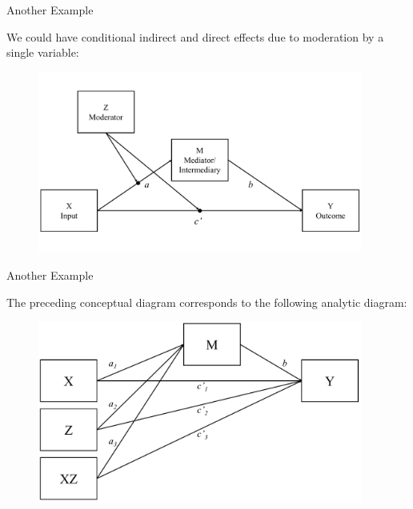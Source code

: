 \documentclass{beamer}
\newcommand{\vb}[0]{\vspace{6pt}}
\begin{document}
\begin{frame}{Another Example}
  
  We could have conditional indirect and direct effects due to
  moderation by a single variable: 
  \vb
  \begin{figure}
    \includegraphics[width=0.95\textwidth]{figures/modACwithZConceptual.pdf}
  \end{figure}
  
\end{frame}



\begin{frame}{Another Example}
  
  The preceding conceptual diagram corresponds to the following
  analytic diagram: 
  \vb
  \begin{figure}
    \includegraphics[width=0.95\textwidth]{figures/modACwithZAnalytic.pdf}
  \end{figure}
  
\end{frame}
\end{document}

